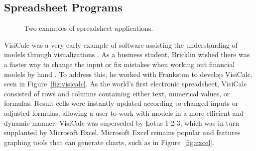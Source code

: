 \subsection{Spreadsheet Programs}

\begin{figure}
\centering

 \qquad
{}

	\caption[Two examples of spreadsheet applications]{Two examples of spreadsheet applications.}
	\label{fig:spreadsheets}
\end{figure}

VisiCalc was a very early example of software assisting the understanding of models through visualizations \cite{grad2007}.  As a business student, Bricklin wished there was a faster way to change the input or fix mistakes when working out financial models by hand \citeyearpar{bricklin1999}.  To address this, he worked with Frankston to develop VisiCalc, seen in Figure~\ref{fig:visicalc}.  As the world's first electronic spreadsheet, VisiCalc consisted of rows and columns containing either text, numerical values, or formulas.  Result cells were instantly updated according to changed inputs or adjusted formulas, allowing a user to work with models in a more efficient and dynamic manner.  VisiCalc was superseded by Lotus 1-2-3, which was in turn supplanted by Microsoft Excel.  Microsoft Excel remains popular and features graphing tools that can generate charts, such as in Figure~\ref{fig:excel}.

